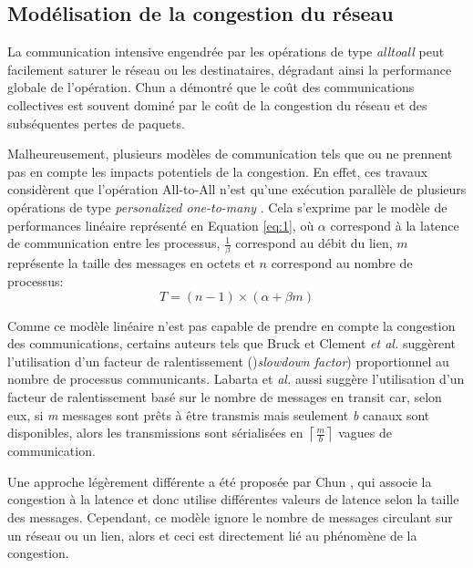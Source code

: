 \subsection{\label{cluster}Modélisation de la congestion du réseau}

La communication intensive engendrée par les opérations de type \textit{alltoall} peut facilement saturer le réseau ou les destinataires, dégradant ainsi la performance globale de l'opération. Chun \cite{Chun01} a démontré que le coût des communications collectives est souvent dominé par le coût de la congestion du réseau et des subséquentes pertes de paquets.

Malheureusement, plusieurs modèles de communication tels que \cite{Christara99} ou \cite{Pjesivac-Grbovic05} ne prennent pas en compte les impacts potentiels de la congestion. En effet, ces travaux considèrent que l'opération All-to-All n'est qu'une exécution parallèle de plusieurs opérations de type \emph{personalized one-to-many} \cite{Johnsson89}. Cela s'exprime par le modèle de performances linéaire représenté en Equation \ref{eq:1}, où $\alpha$ correspond à la latence de communication entre les processus, $\frac{1}{\beta}$ correspond au débit du lien, $m$ représente la taille des messages en octets et  $n$ correspond au nombre de processus:
\begin{equation}
T=(n-1)\times(\alpha+\beta m)\label{eq:1}
\end{equation}

Comme ce modèle linéaire n'est pas capable de prendre en compte la congestion des communications, certains auteurs tels que Bruck \cite{Bruck97b} et Clement \emph{et al.} \cite{Clement96} suggèrent l'utilisation d'un facteur de ralentissement ()\emph{slowdown factor}) proportionnel au nombre de processus communicants.  Labarta et \emph{al.} \cite{Labarta96} aussi suggère l'utilisation d'un facteur de ralentissement basé sur le nombre de messages en transit car, selon eux, si \emph{m} messages sont prêts à être transmis mais seulement \emph{b} canaux sont disponibles, alors les transmissions sont sérialisées en $\left\lceil \frac{m}{b}\right\rceil $ vagues de communication. 

Une approche légèrement différente a été proposée par Chun \cite{Chun01}, qui associe la congestion à la latence et donc utilise différentes valeurs de latence selon la taille des messages. Cependant, ce modèle ignore le nombre de messages circulant sur un réseau ou un lien, alors et ceci est directement lié au phénomène de la congestion. 

